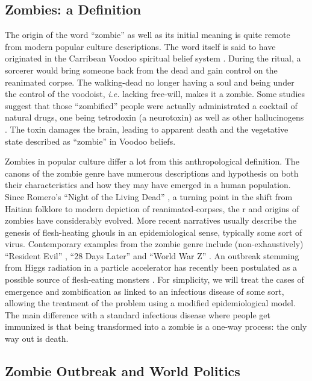 \documentclass[11pt]{article} %
\begin{document}
\subsection{Zombies: a Definition}\indent

The origin of the word ``zombie'' as well as its initial meaning is quite remote from modern popular culture descriptions. The word itself is said to have originated in the Carribean Voodoo spiritual belief system \cite{twohy2008voodoo, davis1997serpent}. During the ritual, a sorcerer would bring someone back from the dead and gain control on the reanimated corpse. The walking-dead no longer having a soul and being under the control of the voodoist, \textit{i.e.} lacking free-will, makes it a zombie. Some studies suggest that those ``zombified'' people were actually administrated a cocktail of natural drugs, one being tetrodoxin (a neurotoxin) as well as other hallucinogens \cite{davis1997serpent, littlewood1997clinical}. The toxin damages the brain, leading to apparent death and the vegetative state described as ``zombie'' in Voodoo beliefs.


Zombies in popular culture differ a lot from this anthropological definition. The canons of the zombie genre have numerous descriptions and hypothesis on both their characteristics and how they may have emerged in a human population. Since Romero's ``Night of the Living Dead'' \cite{nightofthelivingdead}, a turning point in the shift from Haitian folklore to modern depiction of reanimated-corpses, the r and origins of zombies have considerably evolved. More recent narratives usually describe the genesis of flesh-heating ghouls in an epidemiological sense, typically some sort of virus. Contemporary examples from the zombie genre include (non-exhaustively) ``Resident Evil'' \cite{residentevil}, ``28 Days Later'' \cite{28dayslater} and ``World War Z'' \cite{brooks2006world}. An outbreak stemming from Higgs radiation in a particle accelerator has recently been postulated as a possible source of flesh-eating monsters \cite{decay}. For simplicity, we will treat the cases of emergence and zombification as linked to an infectious disease of some sort, allowing the treatment of the problem using a modified epidemiological model. The main difference with a standard infectious disease where people get immunized is that being transformed into a zombie is a one-way process: the only way out is death.



\subsection{Zombie Outbreak and World Politics}\indent
\end{document}
